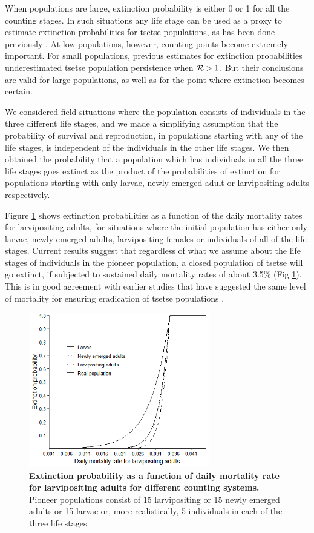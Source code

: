 \documentclass[smallextended]{svjour3}
\begin{document}
When populations are large, extinction probability is either 0 or 1 for all the counting stages. In such situations any life stage can be used as a proxy to estimate extinction probabilities for tsetse populations, as has been done previously \cite{Hargrove2005a,Kajunguri2019}. At low populations, however, counting points become extremely important. For small populations, previous estimates for extinction probabilities underestimated tsetse population persistence when ${\cal R} > 1$. But their conclusions are valid for large populations, as well as for the point where extinction becomes certain.

We considered field situations where the population consists of individuals in the three different life stages, and we made a simplifying assumption that the probability of survival and reproduction, in populations starting with any of the life stages, is independent of the individuals in the other life stages. We then obtained the probability that a population which has individuals in all the three life stages goes extinct as the product of the probabilities of extinction for populations starting with only larvae, newly emerged adult or larvipositing adults respectively. 

Figure \ref{ExtLarviposMort15indiv} shows extinction probabilities as a function of the daily mortality rates for larvipositing adults, for situations where the initial population has either only larvae, newly emerged adults, larvipositing females or individuals of all of the life stages. Current results suggest that regardless of what we assume about the life stages of individuals in the pioneer population, a closed population of tsetse will go extinct, if subjected to sustained daily mortality rates of about 3.5\% (Fig \ref{ExtLarviposMort15indiv}). This is in good agreement with earlier studies that have suggested the same level of mortality for ensuring eradication of tsetse populations \cite{Hargrove2005a,Kajunguri2019}.

\begin{figure}[h]
	\includegraphics[width=0.7\textwidth]{Extinction15individuals.png}
	\caption{{\bf Extinction probability as a function of daily mortality rate for larvipositing adults for different counting systems.}  Pioneer populations consist of 15 larvipositing or 15 newly emerged adults or 15 larvae or, more realistically, 5 individuals in each of the three life stages.}
	
	\label{ExtLarviposMort15indiv}
\end{figure}
\end{document}
